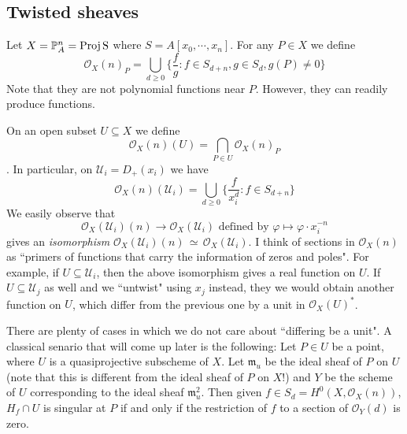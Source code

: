 \documentclass[12pt]{article}
\theoremstyle{plain}
\theoremstyle{definition}
\newcommand{\fm}{\mathfrak{m}}
\newcommand{\IP}{\mathbb{P}}
\newcommand{\sO}{\mathcal{O}}
\newcommand{\sU}{\mathcal{U}}
\newcommand{\Proj}{\rm Proj\,}
\newcommand\iso{{\, \simeq \,}}
\newcommand\union{\bigcup}
\newcommand{\<}{\langle}
\renewcommand{\>}{\rangle}
\begin{document}
\subsection{Twisted sheaves}
Let $X = \IP_A^n = \Proj S$ where $S = A[x_0, \cdots, x_n]$. For any $P \in X$ we define 
$$ \sO_X(n)_P = \union_{d \ge 0}\{ \frac{f}{g} : f \in S_{d+n}, g \in S_d, g(P) \neq 0\}$$
Note that they are not polynomial functions near $P$. However, they can readily produce functions. 
\par On an open subset $U \subseteq X$ we define $$\sO_X(n)(U) = \bigcap_{P \in U} \sO_X(n)_P$$. In particular, on $\sU_i = D_+(x_i)$ we have 
$$ \sO_X(n)(\sU_i) = \union_{d \ge 0} \{\frac{f}{x_i^d} : f \in S_{d + n}\}$$ We easily observe that $$\sO_X(\sU_i)(n) \to \sO_X(\sU_i) \text{ defined by } \varphi \mapsto \varphi \cdot x_i^{-n}$$
gives an \textit{isomorphism} $\sO_X(\sU_i)(n) \iso \sO_X(\sU_i)$. I think of sections in $\sO_X(n)$ as ``primers of functions that carry the information of zeros and poles". For example, if $U \subseteq \sU_i$, then the above isomorphism gives a real function on $U$. If $U \subseteq \sU_j$ as well and we ``untwist" using $x_j$ instead, they we would obtain another function on $U$, which differ from the previous one by a unit in $\sO_X(U)^*$. 
\par There are plenty of cases in which we do not care about ``differing be a unit". A classical senario that will come up later is the following: Let $P \in U$ be a point, where $U$ is a quasiprojective subscheme of $X$. Let $\fm_u$ be the ideal sheaf of $P$ on $U$ (note that this is different from the ideal sheaf of $P$ on $X$!) and $Y$ be the scheme of $U$ corresponding to the ideal sheaf $\fm_u^2$. Then given $f \in S_d = H^0(X, \sO_X(n))$, $H_f \cap U$ is singular at $P$ if and only if the restriction of $f$ to a section of $\sO_{Y}(d)$ is zero. 
\end{document}
